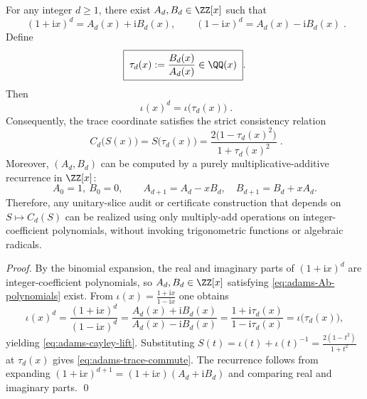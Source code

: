 \begin{proposition}\label{prop:chebyshev-adams-fully-rational}
For any integer \(d\ge 1\), there exist \(A_d,B_d\in\ZZ[x]\) such that
\begin{equation}\label{eq:adams-Ab-polynomials}
\boxed{\;
(1+\mathrm{i}x)^d=A_d(x)+\mathrm{i}B_d(x),\qquad
(1-\mathrm{i}x)^d=A_d(x)-\mathrm{i}B_d(x)\; }.
\end{equation}
Define
\begin{equation}\label{eq:adams-tau-d}
\boxed{\;\tau_d(x):=\frac{B_d(x)}{A_d(x)}\in\QQ(x)\; }.
\end{equation}
Then
\begin{equation}\label{eq:adams-cayley-lift}
\boxed{\;
\iota(x)^d=\iota\!\bigl(\tau_d(x)\bigr)\; }.
\end{equation}
Consequently, the trace coordinate satisfies the strict consistency relation
\begin{equation}\label{eq:adams-trace-commute}
\boxed{\;
C_d\!\bigl(S(x)\bigr)=S\!\bigl(\tau_d(x)\bigr)
=\frac{2\bigl(1-\tau_d(x)^2\bigr)}{1+\tau_d(x)^2}\; }.
\end{equation}
Moreover, \((A_d,B_d)\) can be computed by a purely multiplicative-additive recurrence in \(\ZZ[x]\):
\[
A_0=1,\ B_0=0,\qquad
A_{d+1}=A_d-xB_d,\quad
B_{d+1}=B_d+xA_d.
\]
Therefore, any unitary-slice audit or certificate construction that depends on \(S\mapsto C_d(S)\) can be realized using only multiply-add operations on integer-coefficient polynomials, without invoking trigonometric functions or algebraic radicals.
\end{proposition}
\begin{proof}
By the binomial expansion, the real and imaginary parts of \((1+\mathrm{i}x)^d\) are integer-coefficient polynomials, so \(A_d,B_d\in\ZZ[x]\) satisfying \eqref{eq:adams-Ab-polynomials} exist.
From \(\iota(x)=\frac{1+\mathrm{i}x}{1-\mathrm{i}x}\) one obtains
\[
\iota(x)^d=\frac{(1+\mathrm{i}x)^d}{(1-\mathrm{i}x)^d}
=\frac{A_d(x)+\mathrm{i}B_d(x)}{A_d(x)-\mathrm{i}B_d(x)}
=\frac{1+\mathrm{i}\tau_d(x)}{1-\mathrm{i}\tau_d(x)}
=\iota\!\bigl(\tau_d(x)\bigr),
\]
yielding \eqref{eq:adams-cayley-lift}.
Substituting \(S(t)=\iota(t)+\iota(t)^{-1}=\frac{2(1-t^2)}{1+t^2}\) at \(\tau_d(x)\) gives \eqref{eq:adams-trace-commute}.
The recurrence follows from expanding
\(
(1+\mathrm{i}x)^{d+1}=(1+\mathrm{i}x)(A_d+\mathrm{i}B_d)
\)
and comparing real and imaginary parts. \qed
\end{proof}

